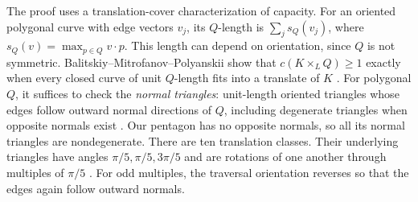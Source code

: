 The proof uses a translation-cover characterization of capacity.
For an oriented polygonal curve with edge vectors $v_j$, its $Q$-length is
$\sum_j s_Q(v_j)$, where $s_Q(v)=\max_{p\in Q}v\cdot p$.
This length can depend on orientation, since $Q$ is not symmetric.
Balitskiy--Mitrofanov--Polyanskii show that $c(K\times_L Q)\ge1$ exactly
when every closed curve of unit $Q$-length fits into a translate of $K$
\cite[Theorem 2.5]{BMP2026v2}.
For polygonal $Q$, it suffices to check the \emph{normal triangles}:
unit-length oriented triangles whose edges follow outward normal directions
of $Q$, including degenerate triangles when opposite normals exist
\cite[Definition 3.2 and Theorem 3.3]{BMP2026v2}. Our pentagon has no opposite
normals, so all its normal triangles are nondegenerate. There are ten translation
classes. Their underlying triangles have angles $\pi/5,\pi/5,3\pi/5$
and are rotations of one another through multiples of $\pi/5$
\cite[Section 6.1]{BMP2026v2}. For odd multiples, the traversal orientation
reverses so that the edges again follow outward normals.

